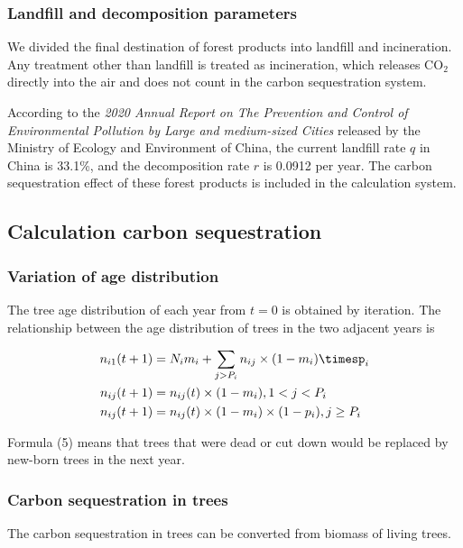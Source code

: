 \subsubsection{Landfill and decomposition parameters}
We divided the final destination of forest products into landfill and incineration. Any treatment other than landfill is treated as incineration, which releases CO$_2$ directly into the air and does not count in the carbon sequestration system.

According to the \emph{2020 Annual Report on The Prevention and Control of Environmental Pollution by Large and medium-sized Cities} released by the Ministry of Ecology and Environment of China, the current landfill rate $q$ in China is 33.1\%, and the decomposition rate $r$ is 0.0912 per year\cite{Decomposition_rate}. The carbon sequestration effect of these forest products is included in the calculation system.

\subsection{Calculation carbon sequestration}
\subsubsection{Variation of age distribution}
The tree age distribution of each year from $t=0$ is obtained by iteration. The relationship between the age distribution of trees in the two adjacent years is

\begin{equation}
\begin{aligned}
    n_{i1}(t+1)&=N_i m_i + \sum_{j>P_i}n_{i j}\times(1-m_i)\timesp_i \\
    n_{i j}(t+1)&=n_{i j}(t)\times(1-m_i),1<j<P_i\\
    n_{i j}(t+1)&=n_{i j}(t)\times(1-m_i)\times(1-p_i),j\ge P_i\\
\end{aligned}
\end{equation}

Formula (5) means that trees that were dead or cut down would be replaced by new-born trees in the next year.

\subsubsection{Carbon sequestration in trees}

The carbon sequestration in trees can be converted from biomass of living trees.

